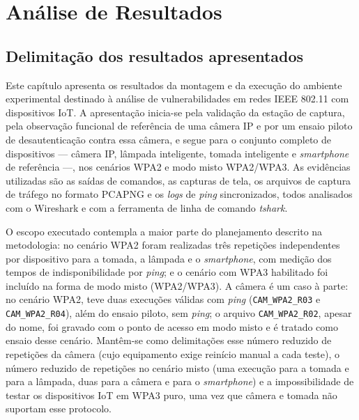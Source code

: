 
\chapter{Análise de Resultados}

\label{cap:analise_resultados}

\section{Delimitação dos resultados apresentados}

Este capítulo apresenta os resultados da montagem e da execução do ambiente experimental destinado à análise de vulnerabilidades em redes IEEE 802.11 com dispositivos IoT. A apresentação inicia-se pela validação da estação de captura, pela observação funcional de referência de uma câmera IP e por um ensaio piloto de desautenticação contra essa câmera, e segue para o conjunto completo de dispositivos --- câmera IP, lâmpada inteligente, tomada inteligente e \textit{smartphone} de referência ---, nos cenários WPA2 e modo misto WPA2/WPA3. As evidências utilizadas são as saídas de comandos, as capturas de tela, os arquivos de captura de tráfego no formato PCAPNG e os \textit{logs} de \textit{ping} sincronizados, todos analisados com o Wireshark e com a ferramenta de linha de comando \textit{tshark}.



O escopo executado contempla a maior parte do planejamento descrito na metodologia: no cenário WPA2 foram realizadas três repetições independentes por dispositivo para a tomada, a lâmpada e o \textit{smartphone}, com medição dos tempos de indisponibilidade por \textit{ping}; e o cenário com WPA3 habilitado foi incluído na forma de modo misto (WPA2/WPA3). A câmera é um caso à parte: no cenário WPA2, teve duas execuções válidas com \textit{ping} (\texttt{CAM\_WPA2\_R03} e \texttt{CAM\_WPA2\_R04}), além do ensaio piloto, sem \textit{ping}; o arquivo \texttt{CAM\_WPA2\_R02}, apesar do nome, foi gravado com o ponto de acesso em modo misto e é tratado como ensaio desse cenário. Mantêm-se como delimitações esse número reduzido de repetições da câmera (cujo equipamento exige reinício manual a cada teste), o número reduzido de repetições no cenário misto (uma execução para a tomada e para a lâmpada, duas para a câmera e para o \textit{smartphone}) e a impossibilidade de testar os dispositivos IoT em WPA3 puro, uma vez que câmera e tomada não suportam esse protocolo.



